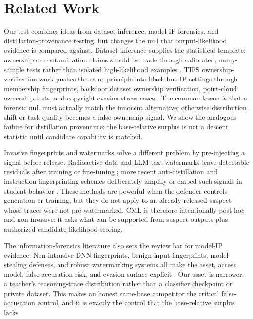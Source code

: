 \section{Related Work}
\label{sec:related}

Our test combines ideas from dataset-inference, model-IP forensics, and
distillation-provenance testing, but changes the null that output-likelihood evidence
is compared against. Dataset inference supplies the statistical template: ownership
or contamination claims should be made through calibrated, many-sample tests rather
than isolated high-likelihood examples
\citep{maini2021datasetinference, maini2024llmdatasetinference,
oren2024testsetcontamination, zhao2025posthocdatasetinference,
dziedzic2022selfsupervised}. TIFS ownership-verification work pushes the same
principle into black-box IP settings through membership fingerprints, backdoor
dataset ownership verification, point-cloud ownership tests, and copyright-evasion
stress cases \citep{liu2022membershipfingerprint, li2023dvbw, wei2025pointncbw,
gao2026ceat2i}. The common lesson is that a forensic null must actually match the
innocent alternative; otherwise distribution shift or task quality becomes a false
ownership signal. We show the analogous failure for distillation provenance: the
base-relative surplus is not a descent statistic until candidate capability is
matched.

Invasive fingerprints and watermarks solve a different problem by pre-injecting a
signal before release. Radioactive data and LLM-text watermarks leave detectable
residuals after training or fine-tuning
\citep{sablayrolles2020radioactivedata, sander2024radioactive}; more recent
anti-distillation and instruction-fingerprinting schemes deliberately amplify or
embed such signals in student behavior
\citep{xu2026antidistillation, yang2026askingback,
xu2024instructionalfingerprinting}. These methods are powerful when the defender
controls generation or training, but they do not apply to an already-released
suspect whose traces were not pre-watermarked. CML is therefore intentionally
post-hoc and non-invasive: it asks what can be supported from suspect outputs plus
authorized candidate likelihood scoring.

The information-forensics literature also sets the review bar for model-IP evidence.
Non-intrusive DNN fingerprints, benign-input fingerprints, model-stealing defenses,
and robust watermarking systems all make the asset, access model, false-accusation
risk, and evasion surface explicit
\citep{zheng2022dnnfingerprint, maho2023fbi, zhang2023cip, zhang2023apmsa,
chen2025queen, gao2024augsteal, li2023linearfunctionality, fei2024wideflat,
zhou2024inversionguided, xu2025ipprotection, yan2025robustnessfingerprint}. Our
asset is narrower: a teacher's reasoning-trace distribution rather than a classifier
checkpoint or private dataset. This makes an honest same-base competitor the critical
false-accusation control, and it is exactly the control that the base-relative
surplus lacks.

